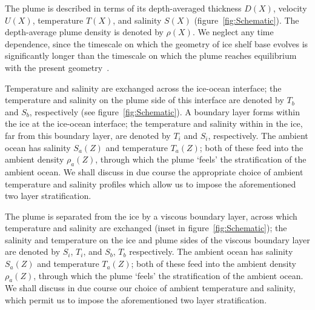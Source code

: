 \documentclass[openacc]{rsproca_new}%
\begin{document}
The plume is described in terms of its depth-averaged thickness $D(X)$, velocity $U(X)$, temperature $T(X)$, and salinity $S(X)$ (figure~\ref{fig:Schematic}). The depth-average plume density is denoted by $\rho(X)$. We neglect any time dependence, since the timescale on which the geometry of ice shelf base evolves is significantly longer than the timescale on which the plume reaches equilibrium with the present geometry~\citep{Hewitt2020AnnRevFlu}.  

Temperature and salinity are exchanged across the ice-ocean interface; the temperature and salinity on the plume side of this interface are denoted by $T_b$ and $S_b$, respectively (see figure~\ref{fig:Schematic}). A boundary layer forms within the ice at the ice-ocean interface; the temperature and salinity within in the ice, far from this boundary layer, are denoted by $T_i$ and $S_i$, respectively. The ambient ocean has salinity $S_a(Z)$ and temperature $T_a(Z)$; both of these feed into the ambient density $\rho_a(Z)$, through which the plume `feels' the stratification of the ambient ocean.  We shall discuss in due course the appropriate choice of ambient temperature and salinity profiles which allow us to impose the aforementioned two layer stratification. 

The plume is separated from the ice by a viscous boundary layer, across which temperature and salinity are exchanged (inset in figure~\ref{fig:Schematic}); the salinity and temperature on the ice and plume sides of the viscous boundary layer are denoted by $S_i$, $T_i$, and $S_b$, $T_b$ respectively. The ambient ocean has salinity $S_a(Z)$ and temperature $T_a(Z)$; both of these feed into the ambient density $\rho_a(Z)$, through which the plume `feels' the stratification of the ambient ocean.  We shall discuss in due course our choice of ambient temperature and salinity, which permit us to impose the aforementioned two layer stratification. 
\end{document}
